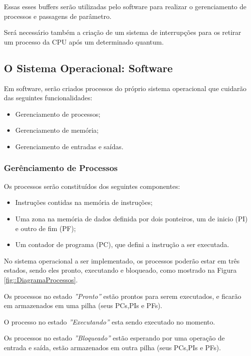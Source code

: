 Essas esses buffers serão utilizadas pelo software para realizar o gerenciamento de processos e passagens de parâmetro.

Será necessário também a criação de um sistema de interrupções para os retirar um processo da CPU após um determinado quantum. 

\subsection{O Sistema Operacional: Software}

Em software, serão criados processos do próprio sistema operacional que cuidarão das seguintes funcionalidades:

\begin{itemize}
	\item Gerenciamento de processos;
	\item Gerenciamento de memória;
	\item Gerenciamento de entradas e saídas.
\end{itemize}

\subsubsection{Gerênciamento de Processos}

Os processos serão constituídos dos seguintes componentes:

\begin{itemize}
	\item Instruções contidas na memória de instruções;
	
	\item Uma zona na memória de dados definida por dois ponteiros, um de inicio (PI) e outro de fim (PF);
	
	\item Um contador de programa (PC), que defini a instrução a ser executada. 
\end{itemize}

No sistema operacional a ser implementado, os processos poderão estar em três estados, sendo eles pronto, executando e bloqueado, como mostrado na Figura \ref{fig::DiagramaProcessos}.

 
Os processos no estado \textit{''Pronto''} estão prontos para serem executados, e ficarão em armazenados em uma pilha (seus PCs,PIs e PFs). 

O processo no estado \textit{''Executando''} esta sendo executado no momento.

Os processos no estado \textit{''Bloqueado''} estão esperando por uma operação de entrada e saída, estão armazenados em outra pilha (seus PCs,PIs e PFs).

